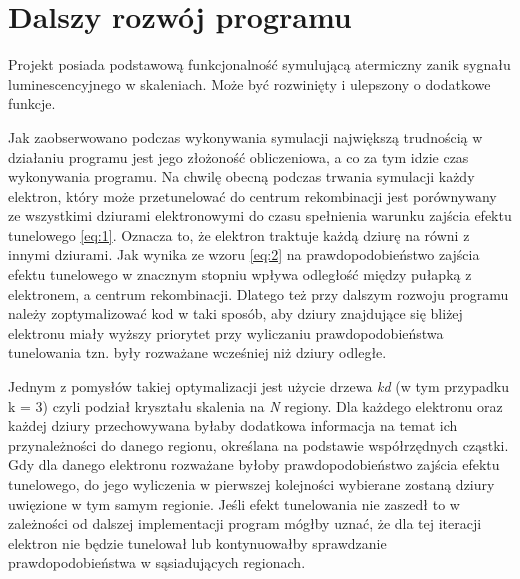 \chapter{Dalszy rozwój programu}
Projekt posiada podstawową funkcjonalność symulującą atermiczny zanik sygnału luminescencyjnego w skaleniach. Może być rozwinięty i ulepszony o dodatkowe funkcje.

Jak zaobserwowano podczas wykonywania symulacji największą trudnością w działaniu programu jest jego złożoność obliczeniowa, a co za tym idzie czas wykonywania programu. Na chwilę obecną podczas trwania symulacji każdy elektron, który może przetunelować do centrum rekombinacji jest porównywany ze wszystkimi dziurami elektronowymi do czasu spełnienia warunku zajścia efektu tunelowego \ref{eq:1}. Oznacza to, że elektron traktuje każdą dziurę na równi z innymi dziurami. Jak wynika ze wzoru \ref{eq:2} na prawdopodobieństwo zajścia efektu tunelowego w znacznym stopniu wpływa odległość między pułapką z elektronem, a centrum rekombinacji. Dlatego też przy dalszym rozwoju programu należy zoptymalizować kod w taki sposób, aby dziury znajdujące się bliżej elektronu miały wyższy priorytet przy wyliczaniu prawdopodobieństwa tunelowania tzn. były rozważane wcześniej niż dziury odległe. 

Jednym z pomysłów takiej optymalizacji jest użycie drzewa \emph{kd} (w tym przypadku k = 3) czyli podział kryształu skalenia na \emph{N} regiony. Dla każdego elektronu oraz każdej dziury przechowywana byłaby dodatkowa informacja na temat ich przynależności do danego regionu, określana na podstawie współrzędnych cząstki. Gdy dla danego elektronu rozważane byłoby prawdopodobieństwo zajścia efektu tunelowego, do jego wyliczenia w pierwszej kolejności wybierane zostaną dziury uwięzione w tym samym regionie. Jeśli efekt tunelowania nie zaszedł to w zależności od dalszej implementacji program mógłby uznać, że dla tej iteracji elektron nie będzie tunelował lub kontynuowałby sprawdzanie prawdopodobieństwa w sąsiadujących regionach.

